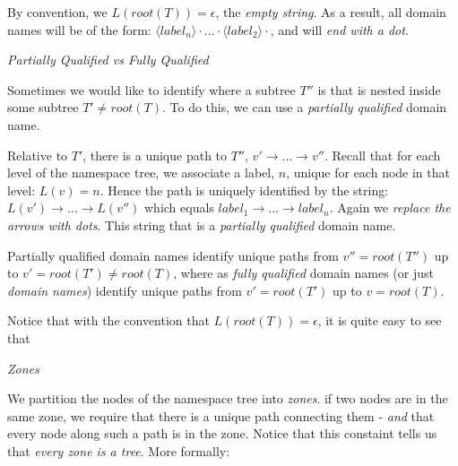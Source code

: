 By convention, we $L(root(T)) = \epsilon$, the \textit{empty string}.
As a result, all domain names will be of the form: 
$\langle label_n \rangle \cdot ... \cdot \langle label_2 \rangle \cdot$, 
and will \textit{end with a dot}.  



\frmrule 

\begin{example}
\end{example}

\frmrule 


\textit{Partially Qualified vs Fully Qualified}

Sometimes we would like to identify where a subtree $T''$ is 
that is nested inside some subtree $T' \neq root(T)$. 
To do this, we can use a \textit{partially qualified} domain name. 

Relative to $T'$, there is a unique path to $T''$, 
$v' \rightarrow ... \rightarrow v''$. Recall that
for each level of the namespace tree, 
we associate a label, $n$, unique for each node in that level: $L(v) = n$. 
Hence the path is uniquely 
identified by the string: $L(v') \rightarrow ... \rightarrow L(v'')$ 
which equals $label_1 \rightarrow ... \rightarrow label_n$. 
Again we \textit{replace the arrows with dots}. 
This string that is a \textit{partially qualified} domain name. 

Partially qualified domain names identify unique paths from $v'' = root(T'')$ up to $v' = root(T') \neq root(T)$, 
where as \textit{fully qualified} domain names (or just \textit{domain names}) 
identify unique paths from $v' = root(T')$ up to $v = root(T)$. 

\frmrule 


\frmrule 

Notice that with the convention that $L(root(T)) = \epsilon$, 
it is quite easy to see that 





\begin{example}
\end{example}

\frmrule 


\textit{Zones}

We partition the nodes of the namespace tree into \textit{zones}. 
if two nodes are in the same zone, we require that there is a unique 
path connecting them - \textit{and} that every node along 
such a path is in the zone. Notice that this constaint tells 
us that \textit{every zone is a tree}. More formally:




